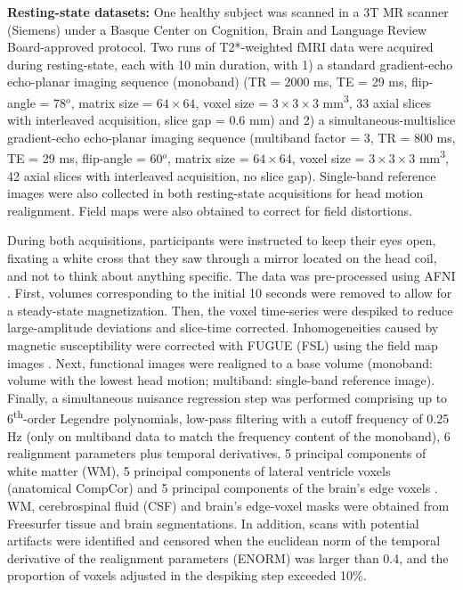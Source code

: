 \textbf{Resting-state datasets:} One healthy subject was scanned in a 3T MR
scanner (Siemens) under a Basque Center on Cognition, Brain and Language Review
Board-approved protocol. Two runs of T2*-weighted fMRI data were acquired during
resting-state, each with 10 min duration, with 1) a standard gradient-echo
echo-planar imaging sequence (monoband) (TR = 2000 ms, TE = 29 ms, flip-angle =
78\(^o\), matrix size = $64\times64$, voxel size = $3\times3\times3$
mm\textsuperscript{3}, 33 axial slices with interleaved acquisition, slice gap =
0.6 mm) and 2) a  simultaneous-multislice gradient-echo echo-planar imaging
sequence (multiband factor = 3, TR = 800 ms, TE = 29 ms, flip-angle = 60\(^o\),
matrix size = $64\times64$, voxel size = $3\times3\times3$
mm\textsuperscript{3}, 42 axial slices with interleaved acquisition, no slice
gap). Single-band reference images were also collected in both resting-state
acquisitions for head motion realignment. Field maps were also obtained to
correct for field distortions.

During both acquisitions, participants were instructed to keep their eyes open,
fixating a white cross that they saw through a mirror located on the head coil,
and not to think about anything specific. The data was pre-processed using AFNI
\citep{Cox1996AFNISoftwareAnalysis}. First, volumes corresponding to the initial
10 seconds were removed to allow for a steady-state magnetization. Then, the
voxel time-series were despiked to reduce large-amplitude deviations and
slice-time corrected. Inhomogeneities caused by magnetic susceptibility were
corrected with FUGUE (FSL) using the field map images \citep{Jenkinson2012FSL}.
Next, functional images were realigned to a base volume (monoband: volume with
the lowest head motion; multiband: single-band reference image). Finally, a
simultaneous nuisance regression step was performed comprising up to
6\textsuperscript{th}-order Legendre polynomials, low-pass filtering with a
cutoff frequency of 0.25 Hz (only on multiband data to match the frequency
content of the monoband), 6 realignment parameters plus temporal derivatives, 5
principal components of white matter (WM), 5 principal components of lateral
ventricle voxels (anatomical CompCor) \citep{Behzadi2007componentbasednoise} and
5 principal components of the brain's edge voxels
\citep{Patriat2015UsingEdgeVoxel}. WM, cerebrospinal fluid (CSF) and brain's
edge-voxel masks were obtained from Freesurfer tissue and brain segmentations.
In addition, scans with potential artifacts were identified and censored when
the euclidean norm of the temporal derivative of the realignment parameters
(ENORM) was larger than 0.4, and the proportion of voxels adjusted in the
despiking step exceeded 10\%.

